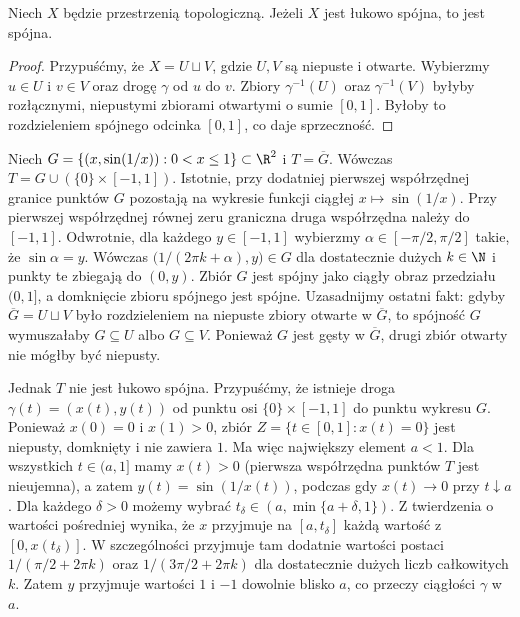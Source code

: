 \begin{stwierdzenie}
Niech $X$ będzie przestrzenią topologiczną. Jeżeli $X$ jest łukowo spójna, to jest spójna.
\end{stwierdzenie}
\begin{proof}
Przypuśćmy, że $X=U\sqcup V$, gdzie $U,V$ są niepuste i otwarte.
Wybierzmy $u\in U$ i $v\in V$ oraz drogę $\gamma$ od $u$ do $v$.
Zbiory $\gamma^{-1}(U)$ oraz $\gamma^{-1}(V)$ byłyby rozłącznymi,
niepustymi zbiorami otwartymi o sumie $[0,1]$. Byłoby to rozdzieleniem
spójnego odcinka $[0,1]$, co daje sprzeczność.
\end{proof}

\begin{przyklad}
\label{prz:sinus-topologa-top-intro}
Niech $G=\{(x,\sin(1/x)):0<x\leq1\}\subset\R^2$ i
$T=\overline G$. Wówczas
$T=G\cup(\{0\}\times[-1,1])$.
Istotnie, przy dodatniej pierwszej współrzędnej granice punktów
$G$ pozostają na wykresie funkcji ciągłej $x\mapsto\sin(1/x)$.
Przy pierwszej współrzędnej równej zeru graniczna druga
współrzędna należy do $[-1,1]$. Odwrotnie, dla każdego
$y\in[-1,1]$ wybierzmy $\alpha\in[-\pi/2,\pi/2]$ takie, że
$\sin\alpha=y$. Wówczas
$\bigl(1/(2\pi k+\alpha),y\bigr)\in G$ dla dostatecznie
dużych $k\in\N$ i punkty te zbiegają do $(0,y)$.
Zbiór $G$ jest spójny jako ciągły obraz przedziału $(0,1]$,
a domknięcie zbioru spójnego jest spójne. Uzasadnijmy
ostatni fakt: gdyby $\overline G=U\sqcup V$ było rozdzieleniem
na niepuste zbiory otwarte w $\overline G$, to spójność $G$
wymuszałaby $G\subseteq U$ albo $G\subseteq V$.
Ponieważ $G$ jest gęsty w $\overline G$, drugi zbiór
otwarty nie mógłby być niepusty.

Jednak $T$ nie jest łukowo spójna. Przypuśćmy, że istnieje droga
$\gamma(t)=(x(t),y(t))$ od punktu osi
$\{0\}\times[-1,1]$ do punktu wykresu $G$.
Ponieważ $x(0)=0$ i $x(1)>0$, zbiór
$Z=\{t\in[0,1]:x(t)=0\}$ jest niepusty,
domknięty i nie zawiera $1$. Ma więc największy
element $a<1$. Dla wszystkich $t\in(a,1]$
mamy $x(t)>0$ (pierwsza współrzędna punktów $T$
jest nieujemna), a zatem
$y(t)=\sin(1/x(t))$, podczas gdy
$x(t)\to0$ przy $t\downarrow a$. Dla każdego $\delta>0$ możemy wybrać
$t_\delta\in(a,\min\{a+\delta,1\})$.
Z twierdzenia o wartości pośredniej wynika, że $x$ przyjmuje
na $[a,t_\delta]$ każdą wartość z $[0,x(t_\delta)]$.
W szczególności przyjmuje tam dodatnie wartości postaci
$1/(\pi/2+2\pi k)$ oraz $1/(3\pi/2+2\pi k)$
dla dostatecznie dużych liczb całkowitych $k$.
Zatem $y$ przyjmuje wartości $1$ i $-1$ dowolnie blisko $a$,
co przeczy ciągłości $\gamma$ w $a$.
\end{przyklad}

